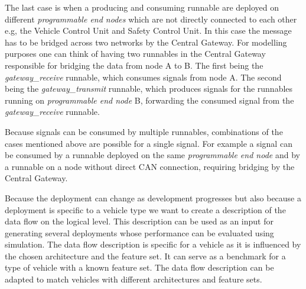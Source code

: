 The last case is when a producing and consuming runnable are deployed on different \textit{programmable end nodes} which are not directly connected to each other e.g, the Vehicle Control Unit and Safety Control Unit. In this case the message has to be bridged across two networks by the Central Gateway. For modelling purposes one can think of having two runnables in the Central Gateway responsible for bridging the data from node A to B. The first being the \textit{gateway\_receive} runnable, which consumes signals from node A. The second being the \textit{gateway\_transmit} runnable, which produces signals for the runnables running on \textit{programmable end node} B, forwarding the consumed signal from the \textit{gateway\_receive} runnable.

Because signals can be consumed by multiple runnables, combinations of the cases mentioned above are possible for a single signal. For example a signal can be consumed by a runnable deployed on the same \textit{programmable end node} and by a runnable on a node without direct CAN connection, requiring bridging by the Central Gateway.

Because the deployment can change as development progresses but also because a deployment is specific to a vehicle type we want to create a description of the data flow on the logical level. This description can be used as an input for generating several deployments whose performance can be evaluated using simulation. The data flow description is specific for a vehicle as it is influenced by the chosen architecture and the feature set. It can serve as a benchmark for a type of vehicle with a known feature set. The data flow description can be adapted to match vehicles with different architectures and feature sets. 

